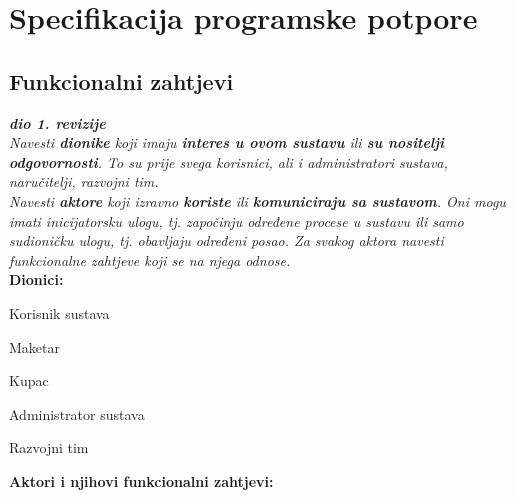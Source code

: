 \chapter{Specifikacija programske potpore}
		
	\section{Funkcionalni zahtjevi}
			
			\textbf{\textit{dio 1. revizije}}\\
			
			\textit{Navesti \textbf{dionike} koji imaju \textbf{interes u ovom sustavu} ili  \textbf{su nositelji odgovornosti}. To su prije svega korisnici, ali i administratori sustava, naručitelji, razvojni tim.}\\
				
			\textit{Navesti \textbf{aktore} koji izravno \textbf{koriste} ili \textbf{komuniciraju sa sustavom}. Oni mogu imati inicijatorsku ulogu, tj. započinju određene procese u sustavu ili samo sudioničku ulogu, tj. obavljaju određeni posao. Za svakog aktora navesti funkcionalne zahtjeve koji se na njega odnose.}\\
			
			
			\noindent \textbf{Dionici:}
			
			\begin{packed_enum}
				
				\item Korisnik sustava
				\begin{packed_enum}	
					\item  Maketar 
					\item  Kupac	
				\end{packed_enum}
				\item Administrator	sustava			
				\item Razvojni tim
				
			\end{packed_enum}
			
			\noindent \textbf{Aktori i njihovi funkcionalni zahtjevi:}
			
